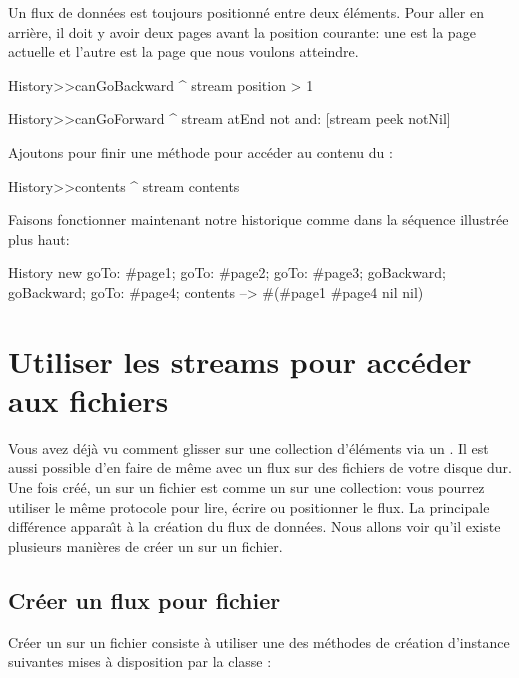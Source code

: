 \documentclass[a4paper,10pt,twoside]{book}
\begin{document}
Un flux de donn\'ees est toujours positionn\'e entre deux \'el\'ements.
Pour aller en arri\`ere, il doit y avoir deux pages avant la position courante:
une est la page actuelle et l'autre est la page que nous voulons atteindre.

\begin{code}{}
History>>canGoBackward
  ^ stream position > 1

History>>canGoForward
  ^ stream atEnd not and: [stream peek notNil]
\end{code}

Ajoutons pour finir une m\'ethode pour acc\'eder au contenu du \stream:
\begin{code}{}
History>>contents
  ^ stream contents
\end{code}

Faisons fonctionner maintenant notre historique 
comme dans la s\'equence illustr\'ee plus haut:
\begin{code}{}
History new
	goTo: #page1;
	goTo: #page2;
	goTo: #page3;
	goBackward;
	goBackward;
	goTo: #page4;
	contents --> #(#page1 #page4 nil nil)
\end{code}

\section{Utiliser les streams pour acc\'eder aux fichiers}

Vous avez d\'ej\`a vu comment glisser sur une collection d'\'el\'ements via
un \stream. Il est aussi possible d'en faire de m\^eme avec un flux 
sur des fichiers de votre disque dur.
Une fois cr\'e\'e, un \stream sur un fichier est comme un \stream sur
une collection: vous pourrez utiliser le m\^eme protocole pour lire, \'ecrire
ou positionner le flux.
La principale diff\'erence appara\^{\i}t \`a la cr\'eation du flux de donn\'ees.
Nous allons voir qu'il existe plusieurs mani\`eres de cr\'eer un \stream sur un fichier.

\subsection{Cr\'eer un flux pour fichier}
\label{sec:creat-file-stre}

Cr\'eer un \stream sur un fichier consiste \`a utiliser une des m\'ethodes
de cr\'eation d'instance suivantes mises \`a disposition par la classe
:
\end{document}
